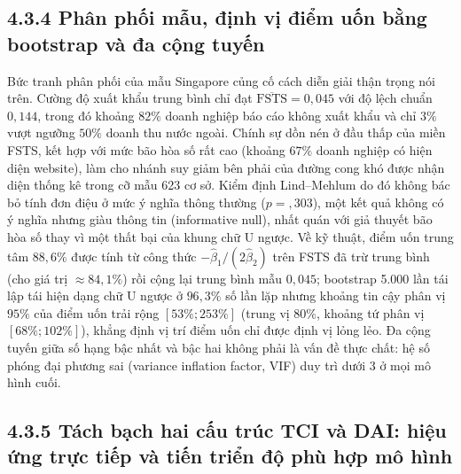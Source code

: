 \documentclass[
  a4paper,
  13pt]{extreport}
\begin{document}
\hypertarget{phuxe2n-phux1ed1i-mux1eabu-ux111ux1ecbnh-vux1ecb-ux111iux1ec3m-uux1ed1n-bux1eb1ng-bootstrap-vuxe0-ux111a-cux1ed9ng-tuyux1ebfn}{%
\subsection{4.3.4 Phân phối mẫu, định vị điểm uốn bằng bootstrap và đa
cộng
tuyến}\label{phuxe2n-phux1ed1i-mux1eabu-ux111ux1ecbnh-vux1ecb-ux111iux1ec3m-uux1ed1n-bux1eb1ng-bootstrap-vuxe0-ux111a-cux1ed9ng-tuyux1ebfn}}

Bức tranh phân phối của mẫu Singapore củng cố cách diễn giải thận trọng
nói trên. Cường độ xuất khẩu trung bình chỉ đạt
\(\overline{\text{FSTS}} = 0{,}045\) với độ lệch chuẩn \(0{,}144\),
trong đó khoảng \(82\%\) doanh nghiệp báo cáo không xuất khẩu và chỉ
\(3\%\) vượt ngưỡng \(50\%\) doanh thu nước ngoài. Chính sự dồn nén ở
đầu thấp của miền FSTS, kết hợp với mức bão hòa số rất cao (khoảng
\(67\%\) doanh nghiệp có hiện diện website), làm cho nhánh suy giảm bên
phải của đường cong khó được nhận diện thống kê trong cỡ mẫu 623 cơ sở.
Kiểm định Lind--Mehlum do đó không bác bỏ tính đơn điệu ở mức ý nghĩa
thông thường (\(p = {,}303\)), một kết quả không có ý nghĩa nhưng giàu
thông tin (informative null), nhất quán với giả thuyết bão hòa số thay
vì một thất bại của khung chữ U ngược. Về kỹ thuật, điểm uốn trung tâm
\(88{,}6\%\) được tính từ công thức \(-\hat{\beta}_1/(2\hat{\beta}_2)\)
trên FSTS đã trừ trung bình (cho giá trị \(\approx 84{,}1\%\)) rồi cộng
lại trung bình mẫu \(0{,}045\); bootstrap 5.000 lần tái lập tái hiện
dạng chữ U ngược ở \(96{,}3\%\) số lần lặp nhưng khoảng tin cậy phân vị
\(95\%\) của điểm uốn trải rộng \([53\%; 253\%]\) (trung vị \(80\%\),
khoảng tứ phân vị \([68\%; 102\%]\)), khẳng định vị trí điểm uốn chỉ
được định vị lỏng lẻo. Đa cộng tuyến giữa số hạng bậc nhất và bậc hai
không phải là vấn đề thực chất: hệ số phóng đại phương sai (variance
inflation factor, VIF) duy trì dưới 3 ở mọi mô hình cuối.

\hypertarget{tuxe1ch-bux1ea1ch-hai-cux1ea5u-truxfac-tci-vuxe0-dai-hiux1ec7u-ux1ee9ng-trux1ef1c-tiux1ebfp-vuxe0-tiux1ebfn-triux1ec3n-ux111ux1ed9-phuxf9-hux1ee3p-muxf4-huxecnh}{%
\subsection{4.3.5 Tách bạch hai cấu trúc TCI và DAI: hiệu ứng trực tiếp
và tiến triển độ phù hợp mô
hình}\label{tuxe1ch-bux1ea1ch-hai-cux1ea5u-truxfac-tci-vuxe0-dai-hiux1ec7u-ux1ee9ng-trux1ef1c-tiux1ebfp-vuxe0-tiux1ebfn-triux1ec3n-ux111ux1ed9-phuxf9-hux1ee3p-muxf4-huxecnh}}
\end{document}
